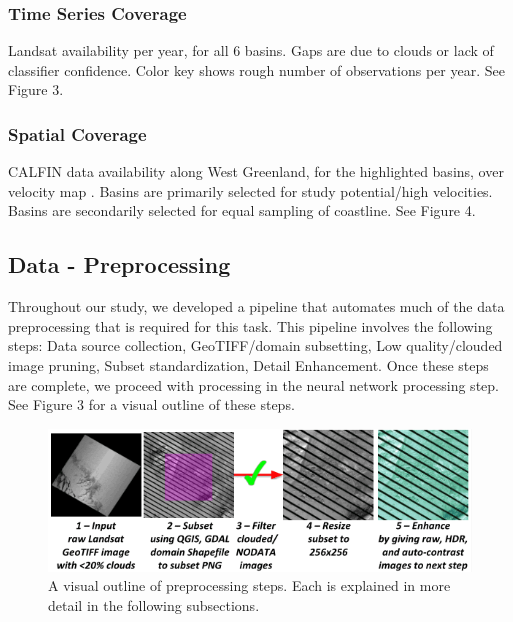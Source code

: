 \documentclass[tc, manuscript]{copernicus}
\begin{document}
\subsubsection{Time Series Coverage}
Landsat availability per year, for all 6 basins. 
Gaps are due to clouds or lack of classifier confidence.
Color key shows rough number of observations per year.
See Figure 3.

\subsubsection{Spatial Coverage}
CALFIN data availability along West Greenland, for the highlighted basins, over velocity map \citep{nagler2015}.
Basins are primarily selected for study potential/high velocities.
Basins are secondarily selected for equal sampling of coastline.
See Figure 4.

\subsection{Data - Preprocessing}
Throughout our study, we developed a pipeline that automates much of the data preprocessing that is required for this task. This pipeline involves the following steps: Data source collection, GeoTIFF/domain subsetting, Low quality/clouded image pruning, Subset standardization, Detail Enhancement.
Once these steps are complete, we proceed with processing in the neural network processing step. See Figure 3 for a visual outline of these steps.


\begin{figure}[t]
\includegraphics[width=14cm]{pipeline-preprocess.png}
\centering
\caption{A visual outline of preprocessing steps. Each is explained in more detail in the following subsections.}
\end{figure}
\end{document}

